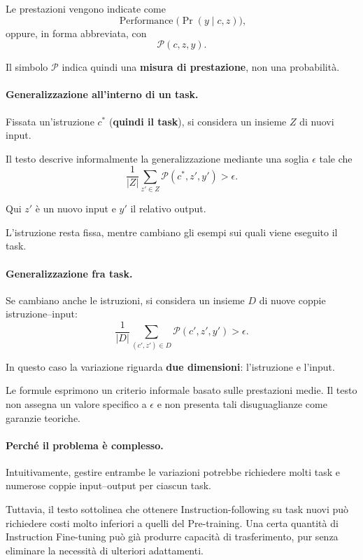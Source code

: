 Le prestazioni vengono indicate come
\[
\operatorname{Performance}\bigl(\Pr(y\mid c,z)\bigr),
\]
oppure, in forma abbreviata, con
\[
\mathcal{P}(c,z,y).
\]

Il simbolo $\mathcal{P}$ indica quindi
una \textbf{misura di prestazione},
non una probabilità.

\paragraph{Generalizzazione all'interno di un task.}
Fissata un'istruzione $c^{*}$ (\textbf{quindi il task}),
si considera un insieme $Z$ di nuovi input.

Il testo descrive informalmente la generalizzazione
mediante una soglia $\epsilon$ tale che
\[
\frac{1}{|Z|}
\sum_{z'\in Z}
\mathcal{P}(c^{*},z',y')
>
\epsilon.
\tag{4.8}
\]

Qui $z'$ è un nuovo input e $y'$ il relativo output.

L'istruzione resta fissa, mentre cambiano
gli esempi sui quali viene eseguito il task.

\paragraph{Generalizzazione fra task.}
Se cambiano anche le istruzioni,
si considera un insieme $D$
di nuove coppie istruzione--input:
\[
\frac{1}{|D|}
\sum_{(c',z')\in D}
\mathcal{P}(c',z',y')
>
\epsilon.
\tag{4.9}
\]

In questo caso la variazione riguarda
\textbf{due dimensioni}: l'istruzione e l'input.

Le formule esprimono un criterio informale
basato sulle prestazioni medie.
Il testo non assegna un valore specifico a $\epsilon$
e non presenta tali disuguaglianze
come garanzie teoriche.

\paragraph{Perché il problema è complesso.}
Intuitivamente, gestire entrambe le variazioni
potrebbe richiedere molti task e numerose coppie
input--output per ciascun task.

Tuttavia, il testo sottolinea che ottenere
Instruction-following su task nuovi
può richiedere costi molto inferiori
a quelli del Pre-training.
Una certa quantità di Instruction Fine-tuning
può già produrre capacità di trasferimento,
pur senza eliminare la necessità
di ulteriori adattamenti.

